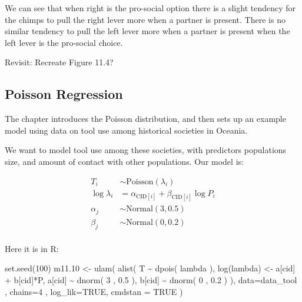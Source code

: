 \documentclass[
]{book}
\newenvironment{Shaded}{\begin{snugshade}}{\end{snugshade}}
\newcommand{\AttributeTok}[1]{\textcolor[rgb]{0.77,0.63,0.00}{#1}}
\newcommand{\ConstantTok}[1]{\textcolor[rgb]{0.00,0.00,0.00}{#1}}
\newcommand{\DecValTok}[1]{\textcolor[rgb]{0.00,0.00,0.81}{#1}}
\newcommand{\FloatTok}[1]{\textcolor[rgb]{0.00,0.00,0.81}{#1}}
\newcommand{\FunctionTok}[1]{\textcolor[rgb]{0.00,0.00,0.00}{#1}}
\newcommand{\NormalTok}[1]{#1}
\newcommand{\OtherTok}[1]{\textcolor[rgb]{0.56,0.35,0.01}{#1}}
\newcommand{\SpecialCharTok}[1]{\textcolor[rgb]{0.00,0.00,0.00}{#1}}
\begin{document}
We can see that when right is the pro-social option there is a slight tendency for the chimps to pull the right lever more when a partner is present. There is no similar tendency to pull the left lever more when a partner is present when the left lever is the pro-social choice.

Revisit: Recreate Figure 11.4?

\hypertarget{poisson-regression}{%
\subsection{Poisson Regression}\label{poisson-regression}}

The chapter introduces the Poisson distribution, and then sets up an example model using data on tool use among historical societies in Oceania.

We want to model tool use among these societies, with predictors populations size, and amount of contact with other populations. Our model is:

\[
\begin{aligned}
T_i &\sim \text{Poisson}(\lambda_i) \\
\log \lambda_i &= \alpha_{\text{CID}[i]}+ \beta_{\text{CID}[i]} \log P_i \\
\alpha_j &\sim \text{Normal}(3,0.5) \\
\beta_j &\sim \text{Normal}(0,0.2)\\
\end{aligned}
\]

Here it is in R:

\begin{Shaded}
\begin{Highlighting}[]
\FunctionTok{set.seed}\NormalTok{(}\DecValTok{100}\NormalTok{)}
\NormalTok{m11}\FloatTok{.10} \OtherTok{\textless{}{-}} \FunctionTok{ulam}\NormalTok{( }\FunctionTok{alist}\NormalTok{( }
\NormalTok{  T }\SpecialCharTok{\textasciitilde{}} \FunctionTok{dpois}\NormalTok{( lambda ), }
  \FunctionTok{log}\NormalTok{(lambda) }\OtherTok{\textless{}{-}}\NormalTok{ a[cid] }\SpecialCharTok{+}\NormalTok{ b[cid]}\SpecialCharTok{*}\NormalTok{P, }
\NormalTok{  a[cid] }\SpecialCharTok{\textasciitilde{}} \FunctionTok{dnorm}\NormalTok{( }\DecValTok{3}\NormalTok{ , }\FloatTok{0.5}\NormalTok{ ), }
\NormalTok{  b[cid] }\SpecialCharTok{\textasciitilde{}} \FunctionTok{dnorm}\NormalTok{( }\DecValTok{0}\NormalTok{ , }\FloatTok{0.2}\NormalTok{ )}
\NormalTok{), }\AttributeTok{data=}\NormalTok{data\_tool , }\AttributeTok{chains=}\DecValTok{4}\NormalTok{ , }\AttributeTok{log\_lik=}\ConstantTok{TRUE}\NormalTok{, }\AttributeTok{cmdstan =} \ConstantTok{TRUE}\NormalTok{ )}
\end{Highlighting}
\end{Shaded}
\end{document}
